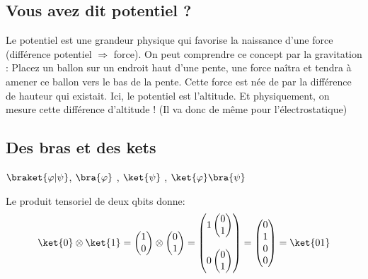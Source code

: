 \subsection{Vous avez dit potentiel ?}
Le potentiel est une grandeur physique qui favorise la naissance d’une force
(différence potentiel $\Rightarrow$ force). On peut comprendre ce concept par la gravitation :
Placez un ballon sur un endroit haut d’une pente, une force naîtra et tendra à
amener ce ballon vers le bas de la pente. Cette force est née de par la différence
de hauteur qui existait. Ici, le potentiel est l’altitude. Et physiquement, on mesure
cette différence d’altitude ! (Il va donc de même pour l’électrostatique)

\subsection{Des bras et des kets}
$\braket{\varphi|\psi}$, $\bra{\varphi}$ , $\ket{\psi}$ , $\ket{\varphi}\bra{\psi}$

Le produit tensoriel de deux qbits donne:
\begin{equation}
    \ket{0}\otimes\ket{1}=
    \begin{pmatrix}
        1\\
        0
    \end{pmatrix}
    \otimes
    \begin{pmatrix}
        0\\
        1
    \end{pmatrix}
    =
    \begin{pmatrix}
        1 \begin{pmatrix}
            0\\
            1
        \end{pmatrix}
        \\ \\
        0 \begin{pmatrix}
            0\\
            1
        \end{pmatrix}
    \end{pmatrix}
    =
    \begin{pmatrix}
        0\\
        1\\
        0\\
        0
    \end{pmatrix}
    =\ket{01}
\end{equation}

